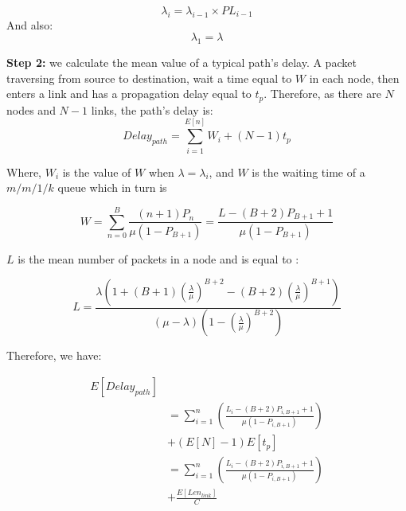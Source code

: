 \documentclass[conference]{IEEEtran}
\begin{document}
    \begin{equation}
        \lambda_i=\lambda_{i-1} \times PL_{i-1}
    \end{equation}
    And also:
    \begin{equation}
        \lambda_1=\lambda
    \end{equation}

    \textbf{Step 2:} we calculate the mean value of a typical path's delay. A packet traversing from source to destination, wait a time equal to $W$ in each node, then enters a link and has a propagation delay equal to $t_p$. Therefore, as there are $N$ nodes and $N-1$ links, the path's delay is:
    \begin{equation}
        Delay_{path}=\sum_{i=1}^{E\left[n\right]}W_i+\left(N-1\right)t_p
    \end{equation}

    Where, $W_i$ is the value of $W$ when $\lambda=\lambda_i$, and $W$ is the waiting time of a $m/m/1/k$ queue which in turn is \cite{b4}

    \begin{equation}
        W=\sum_{n=0}^B\frac{\left(n+1\right)P_n}
        {\mu\left(1-P_{B+1}\right)}=\frac{L-\left(B+2\right)P_{B+1}+1}{\mu\left(1-P_{B+1}\right)}
    \end{equation}

    $L$ is the mean number of packets in a node and is equal to \cite{b4}:

    \begin{equation}
        L=\frac{\lambda\left(1+\left(B+1\right)\left(\frac{\lambda}{\mu}\right)^{B+2}-\left(B+2\right)\left(\frac{\lambda}{\mu}\right)^{B+1}\right)}{\left(\mu-\lambda\right)\left(1-\left(\frac{\lambda}{\mu}\right)^{B+2}\right)}
    \end{equation}

    Therefore, we have:

    \begin{equation}
        \begin{split}
            E\left[Delay_{path}\right]\\&=\sum_{i=1}^n\left(\frac{L_i-\left(B+2\right)P_{i,B+1}+1}{\mu\left(1-P_{i,B+1}\right)}\right)\\&+\left(E\left[N\right]-1\right)E\left[t_p\right]\\&=\sum_{i=1}^n\left(\frac{L_i-\left(B+2\right)P_{i,B+1}+1}{\mu\left(1-P_{i,B+1}\right)}\right)\\&+\frac{E\left[Len_{link}\right]}{C}
        \end{split}
    \end{equation}
\end{document}
